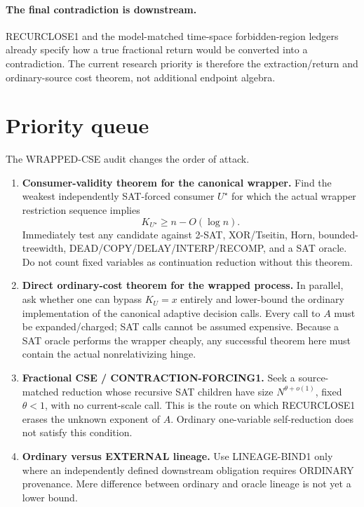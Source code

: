 \documentclass[11pt]{article}
\theoremstyle{plain}
\theoremstyle{definition}
\theoremstyle{remark}
\begin{document}
\paragraph{The final contradiction is downstream.}
RECURCLOSE1 and the model-matched time-space forbidden-region ledgers already
specify how a true fractional return would be converted into a contradiction.
The current research priority is therefore the extraction/return and
ordinary-source cost theorem, not additional endpoint algebra.


\section{Priority queue}

The WRAPPED-CSE audit changes the order of attack.

\begin{enumerate}[leftmargin=1.6em]
\item \textbf{Consumer-validity theorem for the canonical wrapper.}
Find the weakest independently SAT-forced consumer \(U^\star\) for which the
actual wrapper restriction sequence implies
\[
K_{U^\star}\ge n-O(\log n).
\]
Immediately test any candidate against 2-SAT, XOR/Tseitin, Horn,
bounded-treewidth, DEAD/COPY/DELAY/INTERP/RECOMP, and a SAT oracle.  Do not
count fixed variables as continuation reduction without this theorem.

\item \textbf{Direct ordinary-cost theorem for the wrapped process.}
In parallel, ask whether one can bypass \(K_U=x\) entirely and lower-bound the
ordinary implementation of the canonical adaptive decision calls.  Every call
to \(A\) must be expanded/charged; SAT calls cannot be assumed expensive.
Because a SAT oracle performs the wrapper cheaply, any successful theorem
here must contain the actual nonrelativizing hinge.

\item \textbf{Fractional CSE / CONTRACTION-FORCING1.}
Seek a source-matched reduction whose recursive SAT children have size
\(N^{\theta+o(1)}\), fixed \(\theta<1\), with no current-scale call.  This is
the route on which RECURCLOSE1 erases the unknown exponent of \(A\).
Ordinary one-variable self-reduction does not satisfy this condition.

\item \textbf{Ordinary versus EXTERNAL lineage.}
Use LINEAGE-BIND1 only where an independently defined downstream obligation
requires ORDINARY provenance.  Mere difference between ordinary and oracle
lineage is not yet a lower bound.


\end{enumerate}
\end{document}
